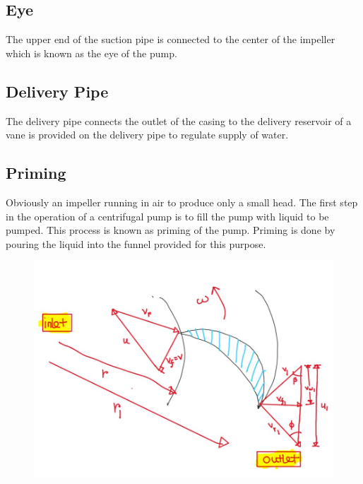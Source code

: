 \documentclass{article}
\begin{document}
\begin{multicols}{2}
  \subsection*{Eye}
  The upper end of the suction pipe is connected to the center of the impeller which is known as the eye of the pump. 

  \subsection*{Delivery Pipe}
  The delivery pipe connects the outlet of the casing to the delivery reservoir of a vane is provided on the delivery pipe to regulate supply of water.

  \subsection*{Priming}
  Obviously an impeller running in air to produce only a small head. The first step in the operation of a centrifugal pump is to fill the pump with liquid to be pumped. This process is known as priming of the pump. Priming is done by pouring the liquid into the funnel provided for this purpose. 
\end{multicols}

\begin{figure}[H]
  \begin{center}
    \includegraphics[width = \columnwidth]{img/centrifugal_work_done.jpg}
  \end{center}
\end{figure}
  
\end{document}
